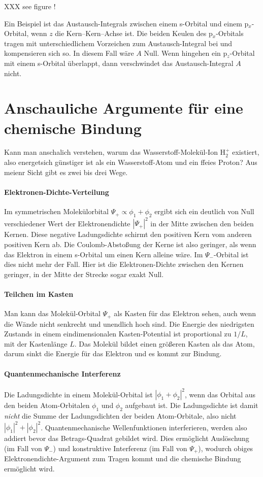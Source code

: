 XXX see figure !


Ein Beispiel ist das Austausch-Integrals zwischen  einem s-Orbital und einem p$_x$-Orbital, wenn $z$ die Kern--Kern--Achse ist.  Die beiden Keulen des  p$_x$-Orbitals tragen mit unterschiedlichem Vorzeichen zum Austausch-Integral bei und kompensieren sich so. In diesem Fall wäre $A$ Null. Wenn hingehen ein p$_z$-Orbital mit einem s-Orbital überlappt, dann verschwindet das  Austausch-Integral $A$ nicht.


\section{Anschauliche Argumente für eine chemische Bindung}

Kann man anschalich verstehen, warum das Wasserstoff-Molekül-Ion H$_2^+$ existiert, also energetsich günstiger ist als ein Wasserstoff-Atom und ein ffeies Proton? Aus meienr Sicht gibt es zwei bis drei Wege.

\paragraph{Elektronen-Dichte-Verteilung} Im symmetrischen Molekülorbital $\Psi_+ \propto \phi_1 + \phi_2$ ergibt sich ein deutlich von Null verschiedener Wert der Elektronendichte $|\Psi_+|^2$ in der Mitte zwischen den beiden Kernen. Diese negative Ladungsdichte schirmt den positiven Kern vom anderen positiven Kern ab. Die Coulomb-Abstoßung der Kerne ist also geringer, als wenn das Elektron in einem s-Orbital um einen Kern alleine  wäre. Im $\Psi_-$-Orbital ist dies nicht mehr der Fall. Hier ist die Elektronen-Dichte zwischen den Kernen geringer, in der Mitte der Strecke sogar exakt Null.

\paragraph{Teilchen im Kasten}  Man kann das Molekül-Orbital $\Psi_+$ als Kasten für das Elektron sehen, auch wenn die Wände nicht senkrecht und unendlich hoch sind. Die Energie des niedrigsten Zustands in einem eindimensionalen  Kasten-Potential ist proportional zu $1/L$, mit der Kastenlänge $L$. Das Molekül bildet einen größeren Kasten als das Atom, darum sinkt die Energie für das Elektron und es kommt zur Bindung.

\paragraph{Quantenmechanische Interferenz} Die Ladungsdichte in einem Molekül-Orbital ist $| \phi_1 + \phi_2 |^2$, wenn das Orbital aus den beiden Atom-Orbitalen $\phi_1$ und $\phi_2$ aufgebaut ist. Die Ladungsdichte ist damit \emph{nicht} die Summe der Ladungsdichten der beiden Atom-Orbitale, also nicht $| \phi_1 |^2 +| \phi_2 |^2$. Quantenmechanische Wellenfunktionen interferieren, werden also addiert bevor das Betrags-Quadrat gebildet wird. Dies ermöglicht Auslöschung (im Fall von $\Psi_-$) und konstruktive Interferenz (im Fall von $\Psi_+$), wodurch obiges Elektronendichte-Argument zum Tragen kommt und  die chemische Bindung ermöglicht wird.


